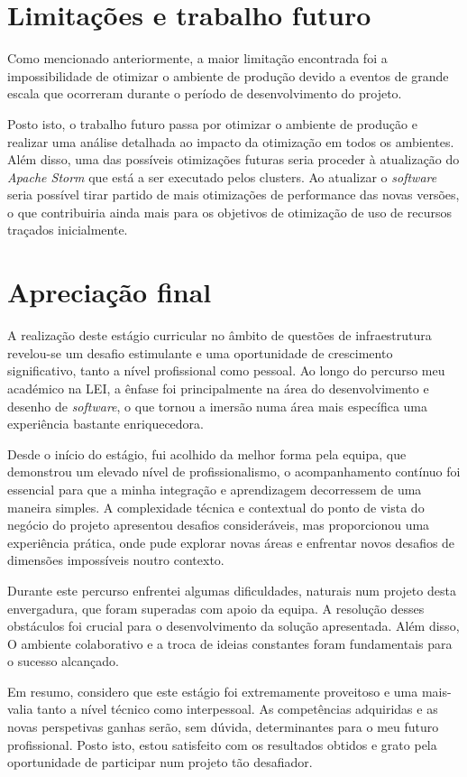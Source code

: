 \section{Limitações e trabalho futuro}

Como mencionado anteriormente, a maior limitação encontrada foi a impossibilidade de otimizar o
ambiente de produção devido a eventos de grande escala que ocorreram durante o período de
desenvolvimento do projeto. 

Posto isto, o trabalho futuro passa por otimizar o ambiente de produção e realizar uma análise 
detalhada ao impacto da otimização em todos os ambientes. Além disso, uma das possíveis otimizações 
futuras seria proceder à atualização do \textit{Apache Storm} que está a ser executado pelos 
\glspl{cluster}. Ao atualizar o \textit{software} seria possível tirar partido de mais otimizações 
de performance das novas versões, o que contribuiria ainda mais para os objetivos de otimização
de uso de recursos traçados inicialmente.

\section{Apreciação final}

A realização deste estágio curricular no âmbito de questões de infraestrutura revelou-se um desafio 
estimulante e uma oportunidade de crescimento significativo, tanto a nível profissional como 
pessoal. Ao longo do percurso meu académico na \ac{LEI}, a ênfase foi principalmente na área do 
desenvolvimento e desenho de \textit{software}, o que tornou a imersão numa área mais específica 
uma experiência bastante enriquecedora.

Desde o início do estágio, fui acolhido da melhor forma pela equipa, que demonstrou um elevado 
nível de profissionalismo, o acompanhamento contínuo foi essencial para que a minha integração e 
aprendizagem decorressem de uma maneira simples. A complexidade técnica e contextual do ponto de 
vista do negócio do projeto apresentou desafios consideráveis, mas proporcionou uma experiência 
prática, onde pude explorar novas áreas e enfrentar novos desafios de dimensões impossíveis noutro 
contexto.

Durante este percurso enfrentei algumas dificuldades, naturais num projeto desta envergadura, que 
foram superadas com apoio da equipa. A resolução desses obstáculos foi crucial para o desenvolvimento
da solução apresentada. Além disso, O ambiente colaborativo e a troca de ideias constantes foram 
fundamentais para o sucesso alcançado.

Em resumo, considero que este estágio foi extremamente proveitoso e uma mais-valia tanto a nível
técnico como interpessoal. As competências adquiridas e as novas perspetivas ganhas serão, sem 
dúvida, determinantes para o meu futuro profissional. Posto isto, estou satisfeito com os resultados 
obtidos e grato pela oportunidade de participar num projeto tão desafiador.

